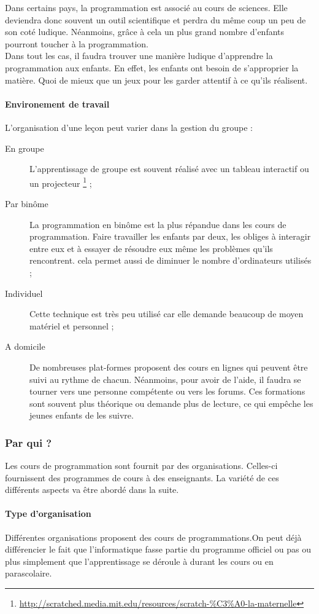 Dans certains pays, la programmation est associé au cours de sciences. Elle deviendra donc souvent un outil scientifique et perdra du même coup un peu de son coté ludique. Néanmoins, grâce à cela un plus grand nombre d'enfants pourront toucher à la programmation.\\

Dans tout les cas, il faudra trouver une manière ludique d'apprendre la programmation aux enfants. En effet, les enfants ont besoin de s'approprier la matière. Quoi de mieux que un jeux pour les garder attentif à ce qu'ils réalisent.

\paragraph{Environement de travail}
L'organisation d'une leçon peut varier dans la gestion du groupe :
\begin{description}
  \item[En groupe] L'apprentissage de groupe est souvent réalisé avec un tableau interactif ou un projecteur \footnote{\url{http://scratched.media.mit.edu/resources/scratch-\%C3\%A0-la-maternelle}} ;
  \item[Par binôme] La programmation en binôme est la plus répandue dans les cours de programmation. Faire travailler les enfants par deux, les obliges à interagir entre eux et à essayer de résoudre eux même les problèmes qu'ils rencontrent. cela permet aussi de diminuer le nombre d'ordinateurs utilisés ;
  \item[Individuel] Cette technique est très peu utilisé car elle demande beaucoup de moyen matériel et personnel ;
  \item[A domicile] De nombreuses plat-formes proposent des cours en lignes qui peuvent être suivi au rythme de chacun. Néanmoins, pour avoir de l'aide, il faudra se tourner vers une personne compétente ou vers les forums. Ces formations sont souvent plus théorique ou demande plus de lecture, ce qui empêche les jeunes enfants de les suivre.
\end{description}

\subsubsection{Par qui ?}
Les cours de programmation sont fournit par des organisations. Celles-ci fournissent des programmes de cours à des enseignants. La variété de ces différents aspects va être abordé dans la suite.

\paragraph{Type d'organisation}
Différentes organisations proposent des cours de programmations.On peut déjà différencier le fait que l'informatique fasse partie du programme officiel ou pas ou plus simplement que l'apprentissage se déroule à durant les cours ou en parascolaire.\\

